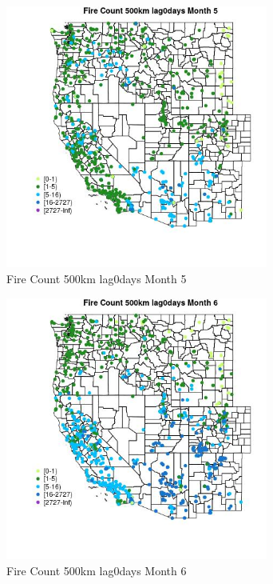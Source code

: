 \begin{figure} 
\centering  
\includegraphics[width=0.77\textwidth]{Code_Outputs/Report_ML_input_PM25_Step4_part_f_de_duplicated_aves_prioritize_24hr_obswNAs_MapObsMo5Fire_Count_500km_lag0days.jpg} 
\caption{\label{fig:Report_ML_input_PM25_Step4_part_f_de_duplicated_aves_prioritize_24hr_obswNAsMapObsMo5Fire_Count_500km_lag0days}Fire Count 500km lag0days Month 5} 
\end{figure} 
 

\begin{figure} 
\centering  
\includegraphics[width=0.77\textwidth]{Code_Outputs/Report_ML_input_PM25_Step4_part_f_de_duplicated_aves_prioritize_24hr_obswNAs_MapObsMo6Fire_Count_500km_lag0days.jpg} 
\caption{\label{fig:Report_ML_input_PM25_Step4_part_f_de_duplicated_aves_prioritize_24hr_obswNAsMapObsMo6Fire_Count_500km_lag0days}Fire Count 500km lag0days Month 6} 
\end{figure} 
 

